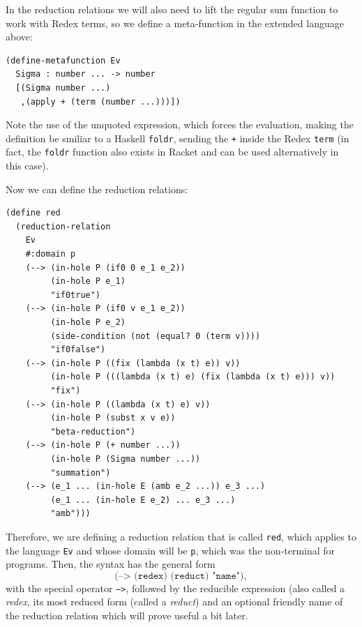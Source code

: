 In the reduction relations we will also need to lift the regular sum function
to work with Redex terms, so we define a meta-function in the extended
language above:
{
  \small
\begin{verbatim}
(define-metafunction Ev
  Sigma : number ... -> number
  [(Sigma number ...)
   ,(apply + (term (number ...)))])
\end{verbatim}
}
Note the use of the unquoted expression, which forces the evaluation, making
the definition be smiliar to a Haskell \texttt{foldr}, sending the \texttt{+}
inside the Redex \texttt{term} (in fact, the \texttt{foldr} function also
exists in Racket and can be used alternatively in this case).

Now we can define the reduction relations\footnotemark:

  
\newpage
{
  \small
\begin{verbatim}
(define red
  (reduction-relation
    Ev
    #:domain p
    (--> (in-hole P (if0 0 e_1 e_2))
         (in-hole P e_1)
         "if0true")
    (--> (in-hole P (if0 v e_1 e_2))
         (in-hole P e_2)
         (side-condition (not (equal? 0 (term v))))
         "if0false")
    (--> (in-hole P ((fix (lambda (x t) e)) v))
         (in-hole P (((lambda (x t) e) (fix (lambda (x t) e))) v))
         "fix")
    (--> (in-hole P ((lambda (x t) e) v))
         (in-hole P (subst x v e))
         "beta-reduction")
    (--> (in-hole P (+ number ...))
         (in-hole P (Sigma number ...))
         "summation")
    (--> (e_1 ... (in-hole E (amb e_2 ...)) e_3 ...)
         (e_1 ... (in-hole E e_2) ... e_3 ...)
         "amb")))
\end{verbatim}
}

\newpage

Therefore, we are defining a reduction relation that is called \texttt{red},
which applies to the language \texttt{Ev} and whose domain will be \texttt{p},
which was the non-terminal for programs. Then, the syntax has the general form
\[
  \texttt{(--> (redex) (reduct) "name")},
\]
with the special operator \texttt{-->}, followed by the reducible expression
(also called a \emph{redex}, its most reduced form (called a \emph{reduct})
and an optional friendly name of the reduction relation which will prove
useful a bit later.

